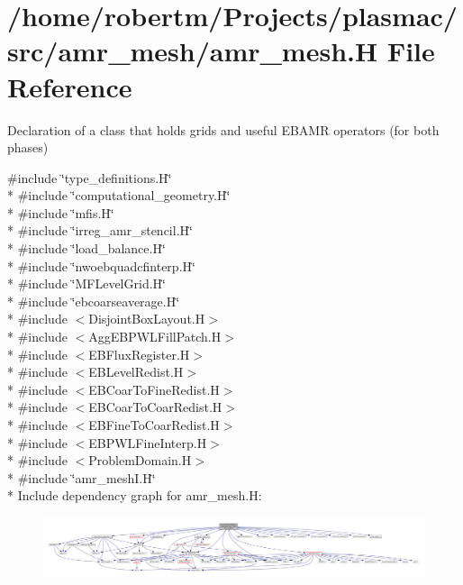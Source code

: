 \hypertarget{amr__mesh_8H}{}\section{/home/robertm/\+Projects/plasmac/src/amr\+\_\+mesh/amr\+\_\+mesh.H File Reference}
\label{amr__mesh_8H}


Declaration of a class that holds grids and useful E\+B\+A\+MR operators (for both phases)  


{\ttfamily \#include \char`\"{}type\+\_\+definitions.\+H\char`\"{}}\\*
{\ttfamily \#include \char`\"{}computational\+\_\+geometry.\+H\char`\"{}}\\*
{\ttfamily \#include \char`\"{}mfis.\+H\char`\"{}}\\*
{\ttfamily \#include \char`\"{}irreg\+\_\+amr\+\_\+stencil.\+H\char`\"{}}\\*
{\ttfamily \#include \char`\"{}load\+\_\+balance.\+H\char`\"{}}\\*
{\ttfamily \#include \char`\"{}nwoebquadcfinterp.\+H\char`\"{}}\\*
{\ttfamily \#include \char`\"{}M\+F\+Level\+Grid.\+H\char`\"{}}\\*
{\ttfamily \#include \char`\"{}ebcoarseaverage.\+H\char`\"{}}\\*
{\ttfamily \#include $<$Disjoint\+Box\+Layout.\+H$>$}\\*
{\ttfamily \#include $<$Agg\+E\+B\+P\+W\+L\+Fill\+Patch.\+H$>$}\\*
{\ttfamily \#include $<$E\+B\+Flux\+Register.\+H$>$}\\*
{\ttfamily \#include $<$E\+B\+Level\+Redist.\+H$>$}\\*
{\ttfamily \#include $<$E\+B\+Coar\+To\+Fine\+Redist.\+H$>$}\\*
{\ttfamily \#include $<$E\+B\+Coar\+To\+Coar\+Redist.\+H$>$}\\*
{\ttfamily \#include $<$E\+B\+Fine\+To\+Coar\+Redist.\+H$>$}\\*
{\ttfamily \#include $<$E\+B\+P\+W\+L\+Fine\+Interp.\+H$>$}\\*
{\ttfamily \#include $<$Problem\+Domain.\+H$>$}\\*
{\ttfamily \#include \char`\"{}amr\+\_\+mesh\+I.\+H\char`\"{}}\\*
Include dependency graph for amr\+\_\+mesh.\+H\+:\nopagebreak
\begin{figure}[H]
\begin{center}
\leavevmode
\includegraphics[width=350pt]{amr__mesh_8H__incl}
\end{center}
\end{figure}

